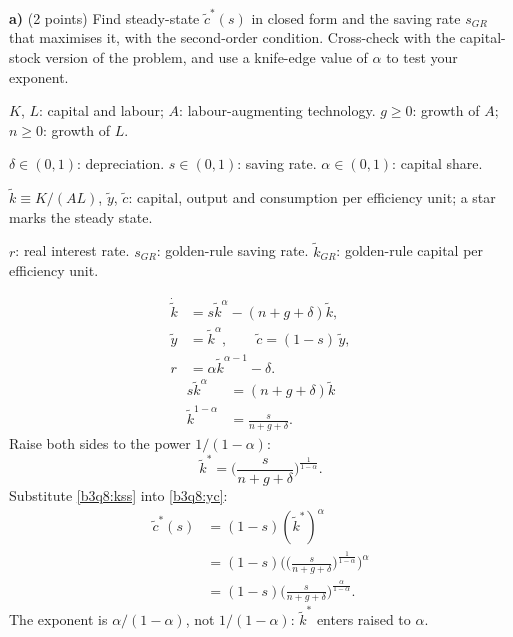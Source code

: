 \textbf{a)} (2 points) Find steady-state $\tilde c^*(s)$ in closed form and the saving rate $s_{GR}$ that maximises it, with the second-order
condition. Cross-check with the capital-stock version of the problem, and use a knife-edge value of $\alpha$ to test your exponent.
\resolespaco
\begin{sol}
\begin{notacao}
\item $K$, $L$: capital and labour; $A$: labour-augmenting technology. $g\ge0$: growth of $A$; $n\ge0$: growth of $L$.
\item $\delta\in(0,1)$: depreciation. $s\in(0,1)$: saving rate. $\alpha\in(0,1)$: capital share.
\item $\tilde k\equiv K/(AL)$, $\tilde y$, $\tilde c$: capital, output and consumption per efficiency unit; a star marks the steady state.
\item $r$: real interest rate. $s_{GR}$: golden-rule saving rate. $\tilde k_{GR}$: golden-rule capital per efficiency unit.
\end{notacao}
\begin{align}
\dot{\tilde k}&=s\tilde k^{\alpha}-(n+g+\delta)\tilde k, \label{b3q8:kdot}\\
\tilde y&=\tilde k^{\alpha},\qquad \tilde c=(1-s)\,\tilde y, \label{b3q8:yc}\\
r&=\alpha\tilde k^{\alpha-1}-\delta. \label{b3q8:r}
\end{align}
\begin{align}
s\tilde k^{\alpha}&=(n+g+\delta)\tilde k \label{b3q8:be}\\
\tilde k^{1-\alpha}&=\frac{s}{n+g+\delta}. \nonumber
\end{align}
Raise both sides to the power $1/(1-\alpha)$:
\begin{equation}
\tilde k^*=\Big(\frac{s}{n+g+\delta}\Big)^{\frac1{1-\alpha}}. \label{b3q8:kss}
\end{equation}
Substitute \eqref{b3q8:kss} into \eqref{b3q8:yc}:
\begin{align}
\tilde c^*(s)&=(1-s)(\tilde k^*)^{\alpha}\nonumber\\
&=(1-s)\Big(\Big(\frac{s}{n+g+\delta}\Big)^{\frac1{1-\alpha}}\Big)^{\alpha}\nonumber\\
&=(1-s)\Big(\frac{s}{n+g+\delta}\Big)^{\frac{\alpha}{1-\alpha}}. \label{b3q8:css}
\end{align}
The exponent is $\alpha/(1-\alpha)$, not $1/(1-\alpha)$: $\tilde k^*$ enters raised to $\alpha$.

\end{sol}

